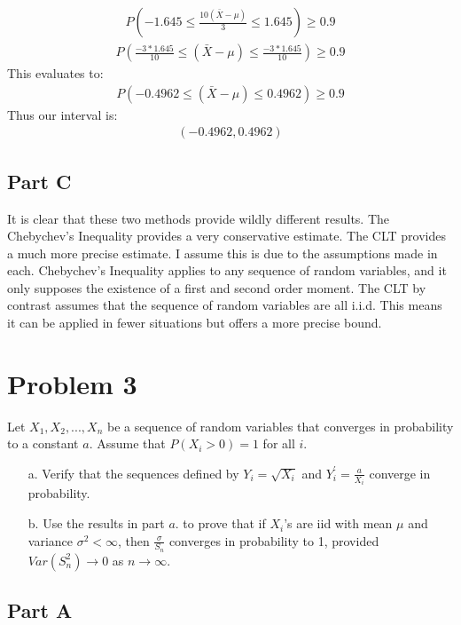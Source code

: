 \documentclass{article}
\begin{document}
\begin{align*}
P(-1.645 \leq \frac{10(\bar{X}-\mu)}{3} \leq 1.645) \geq 0.9
\end{align*}
\begin{align*}
P(\frac{-3*1.645}{10} \leq (\bar{X}-\mu) \leq \frac{-3*1.645}{10}) \geq 0.9
\end{align*}
This evaluates to:
\begin{align*}
P(-0.4962 \leq (\bar{X}-\mu) \leq 0.4962) \geq 0.9
\end{align*}
Thus our interval is:
\begin{align*}
\boxed{(-0.4962,0.4962)}
\end{align*}
\subsection*{Part C}
It is clear that these two methods provide wildly different results. The Chebychev's Inequality provides a very conservative estimate. The CLT provides a much more precise estimate. I assume this is due to the assumptions made in each. Chebychev's Inequality applies to any sequence of random variables, and it only supposes the existence of a first and second order moment. The CLT by contrast assumes that the sequence of random variables are all i.i.d. This means it can be applied in fewer situations but offers a more precise bound.

\clearpage

\section*{Problem 3}
Let $X_1, X_2,..., X_n$ be a sequence of random variables that converges in probability to a constant $a$. Assume that $P(X_i>0)=1$ for all $i$.
\begin{enumerate}
\item[a.] Verify that the sequences defined by $Y_i=\sqrt{X_i}$ and $Y^{'}_{i}=\tfrac{a}{X_i}$ converge in probability.
\item[b.] Use the results in part $a.$ to prove that if $X_i$'s are iid with mean $\mu$ and variance $\sigma^2 < \infty$, then $\frac{\sigma}{S_n}$ converges in probability to 1, provided $Var(S^2_n)\rightarrow 0$ as $n \rightarrow \infty$.
\end{enumerate}
\subsection*{Part A}
\end{document}
